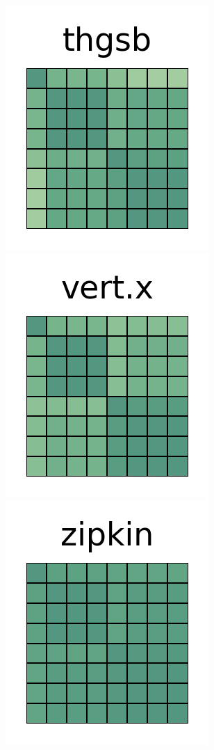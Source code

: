 \documentclass[10pt,conference]{IEEEtran}
\begin{document}
\begin{figure}[htb!]
 \includegraphics[width=\heatmapWidth, keepaspectratio]{entropy-correlations/thingsboard-grids.png}
 \includegraphics[width=\heatmapWidth, keepaspectratio]{entropy-correlations/vert.x-grids.png}
 \includegraphics[width=\heatmapWidth, keepaspectratio]{entropy-correlations/zipkin-grids.png}

\end{figure}
\end{document}
